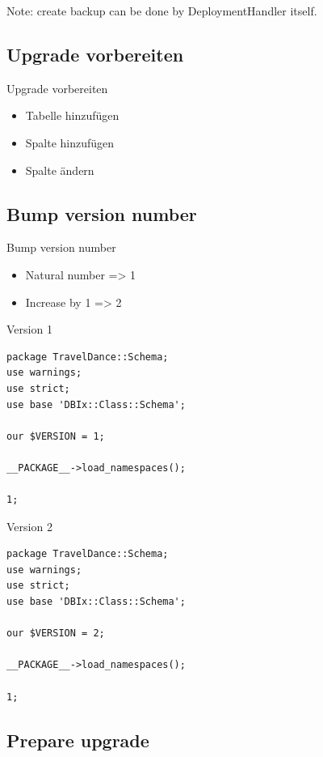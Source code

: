 Note: create backup can be done by DeploymentHandler itself.

\subsection{Upgrade vorbereiten}

\begin{frame}{Upgrade vorbereiten}
\begin{itemize}
\item Tabelle hinzufügen
\item Spalte hinzufügen
\item Spalte ändern
\end{itemize}
\end{frame}

\subsection{Bump version number}
\begin{frame}{Bump version number}
\begin{itemize}
\item Natural number => 1
\item Increase by 1 => 2
\end{itemize}
\end{frame}

\begin{frame}[fragile]{Version 1}
\begin{lstlisting}
package TravelDance::Schema;
use warnings;
use strict;
use base 'DBIx::Class::Schema';

our $VERSION = 1;

__PACKAGE__->load_namespaces();

1;
\end{lstlisting}
\end{frame}

\begin{frame}[fragile]{Version 2}
\begin{lstlisting}
package TravelDance::Schema;
use warnings;
use strict;
use base 'DBIx::Class::Schema';

our $VERSION = 2;

__PACKAGE__->load_namespaces();

1;
\end{lstlisting}
\end{frame}

\subsection{Prepare upgrade}

